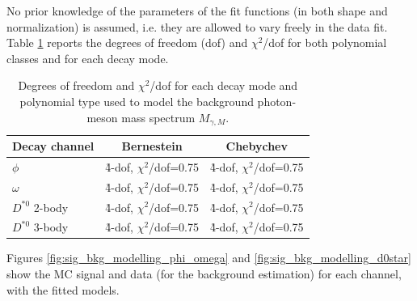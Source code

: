 No prior knowledge of the parameters of the fit functions (in both shape and normalization) is assumed, i.e. they are allowed to vary freely in the data fit. Table \ref{tab:bkg_polynomials} reports the degrees of freedom (dof) and $\chi^2$/dof for both polynomial classes and for each decay mode.
\begin{table}[!ht]
    \centering
    \begin{tabular}{|l|c|c|}
        \hline
        \cellcolor{lightgray}Decay channel & \cellcolor{lightgray}Bernestein & \cellcolor{lightgray}Chebychev \\ \hline
        $\phi$          &\r4-dof, $\chi^2$/dof=0.75   &\r4-dof, $\chi^2$/dof=0.75   \\
        $\omega$        &\r4-dof, $\chi^2$/dof=0.75   &\r4-dof, $\chi^2$/dof=0.75   \\
        $D^{*0}$ 2-body &\r4-dof, $\chi^2$/dof=0.75   &\r4-dof, $\chi^2$/dof=0.75   \\
        $D^{*0}$ 3-body &\r4-dof, $\chi^2$/dof=0.75   &\r4-dof, $\chi^2$/dof=0.75   \\
        \hline
        \end{tabular}
    \caption{Degrees of freedom and $\chi^2$/dof for each decay mode and polynomial type used to model the background photon-meson mass spectrum $M_{\gamma, M}$.}
    \label{tab:bkg_polynomials}
\end{table}

Figures \ref{fig:sig_bkg_modelling_phi_omega} and \ref{fig:sig_bkg_modelling_d0star} show the MC signal and data (for the background estimation) for each channel, with the fitted models. 

